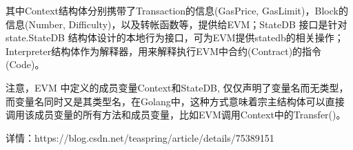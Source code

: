 \documentclass[UTF8]{ctexart}
\begin{document}
其中Context结构体分别携带了Transaction的信息(GasPrice, GasLimit)，Block的信息(Number, Difficulty)，以及转帐函数等，提供给EVM；StateDB 接口是针对state.StateDB 结构体设计的本地行为接口，可为EVM提供statedb的相关操作； Interpreter结构体作为解释器，用来解释执行EVM中合约(Contract)的指令(Code)。

注意，EVM 中定义的成员变量Context和StateDB, 仅仅声明了变量名而无类型，而变量名同时又是其类型名，在Golang中，这种方式意味着宗主结构体可以直接调用该成员变量的所有方法和成员变量，比如EVM调用Context中的Transfer()。

详情：https://blog.csdn.net/teaspring/article/details/75389151

\ifx\allfiles\undefined
\end{document}
